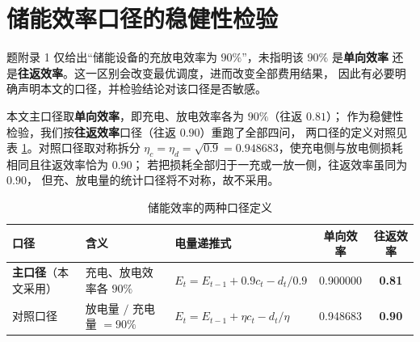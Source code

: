 %
%
%

\section{储能效率口径的稳健性检验}
\label{sec:eff-robust}

题附录 1 仅给出“储能设备的充放电效率为 $90\%$”，未指明该 $90\%$ 是\textbf{单向效率}
还是\textbf{往返效率}。这一区别会改变最优调度，进而改变全部费用结果，
因此有必要明确声明本文的口径，并检验结论对该口径是否敏感。

本文主口径取\textbf{单向效率}，即充电、放电效率各为 $90\%$（往返 $0.81$）；
作为稳健性检验，我们按\textbf{往返效率}口径（往返 $0.90$）重跑了全部四问，
两口径的定义对照见表 \ref{tab:eff-def}。对照口径取对称拆分
$\eta_c=\eta_d=\sqrt{0.9}=0.948683$，使充电侧与放电侧损耗相同且往返效率恰为 $0.90$；
若把损耗全部归于一充或一放一侧，往返效率虽同为 $0.90$，
但充、放电量的统计口径将不对称，故不采用。

\begin{table}[H]
\centering
\caption{储能效率的两种口径定义}
\label{tab:eff-def}
\begin{tabularx}{\textwidth}{@{}l l X c c@{}}
\toprule
口径 & 含义 & 电量递推式 & 单向效率 & 往返效率 \\
\midrule
\textbf{主口径}（本文采用） & 充电、放电效率各 $90\%$
  & $E_t=E_{t-1}+0.9c_t-d_t/0.9$ & 0.900000 & \textbf{0.81} \\
对照口径 & 放电量 $/$ 充电量 $=90\%$
  & $E_t=E_{t-1}+\eta c_t-d_t/\eta$ & 0.948683 & \textbf{0.90} \\
\bottomrule
\end{tabularx}
\end{table}

